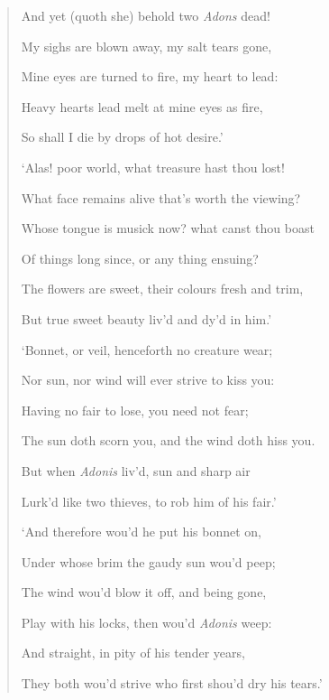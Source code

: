 \documentclass[a4paper, 11pt, oneside, polutonikogreek, english]{article}
\begin{document}
\begin{quotation}
And yet (quoth she) behold two \emph{Adons} dead!

My sighs are blown away, my salt tears gone,

Mine eyes are turned to fire, my heart to lead:

\hspace*{15mm}Heavy hearts lead melt at mine eyes as fire,

\hspace*{15mm}So shall I die by drops of hot desire.'

\bigskip

`Alas! poor world, what treasure hast thou lost!

What face remains alive that's worth the viewing?

Whose tongue is musick now? what canst thou boast

Of things long since, or any thing ensuing?

\hspace*{15mm}The flowers are sweet, their colours fresh and trim,

\hspace*{15mm}But true sweet beauty liv'd and dy'd in him.'

\bigskip

`Bonnet, or veil, henceforth no creature wear;

Nor sun, nor wind will ever strive to kiss you:

Having no fair to lose, you need not fear;

The sun doth scorn you, and the wind doth hiss you.

\hspace*{15mm}But when \emph{Adonis} liv'd, sun and sharp air

\hspace*{15mm}Lurk'd like two thieves, to rob him of his fair.'

\bigskip

`And therefore wou'd he put his bonnet on,

Under whose brim the gaudy sun wou'd peep;

The wind wou'd blow it off, and being gone,

Play with his locks, then wou'd \emph{Adonis} weep:

\hspace*{15mm}And straight, in pity of his tender years,

\hspace*{15mm}They both wou'd strive who first shou'd dry his tears.'


\end{quotation}
\end{document}

